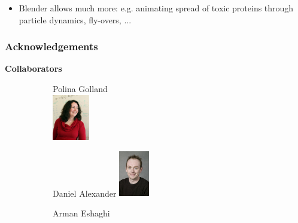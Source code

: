 \documentclass[10pt,xcolor=table,aspectratio=169]{beamer}
\begin{document}
\begin{frame}
\begin{columns}
\begin{column}[t]{0.5\textwidth}
  
  \end{column}

 \end{columns}

\vspace{2em}
\begin{itemize}
  \item Blender allows much more: e.g. animating spread of toxic proteins through particle dynamics, fly-overs, ...
\end{itemize}
 
 
 
  
\end{frame}


\begin{frame}
 \frametitle{Acknowledgements}



\textbf{Collaborators}
\begin{figure}
\begin{subfigure}{0.2\textwidth}
\centering
Polina Golland\\

\includegraphics[height=2cm]{images/polina} 
\end{subfigure}
\begin{subfigure}{0.2\textwidth}
\centering
Daniel Alexander
\includegraphics[height=2cm]{images/danny} 
\end{subfigure}
\begin{subfigure}{0.2\textwidth}
\centering
Arman Eshaghi\\
 

\end{subfigure}
\end{figure}
\end{frame}
\end{document}
